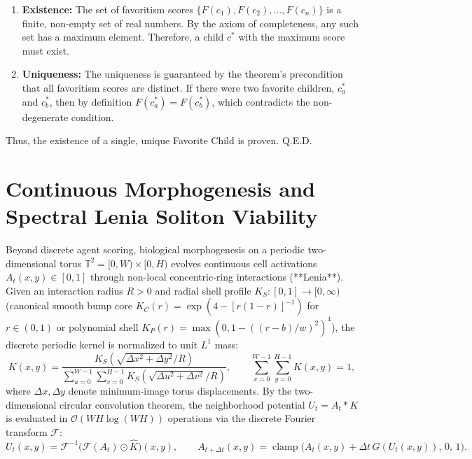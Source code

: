 \documentclass[12pt]{article}
\begin{document}
\begin{enumerate}
    \item \textbf{Existence:} The set of favoritism scores \( \{F(c_1), F(c_2), \dots, F(c_n)\} \) is a finite, non-empty set of real numbers. By the axiom of completeness, any such set has a maximum element. Therefore, a child \( c^* \) with the maximum score must exist.
    \item \textbf{Uniqueness:} The uniqueness is guaranteed by the theorem's precondition that all favoritism scores are distinct. If there were two favorite children, \( c_a^* \) and \( c_b^* \), then by definition \( F(c_a^*) = F(c_b^*) \), which contradicts the non-degenerate condition.
\end{enumerate}

Thus, the existence of a single, unique Favorite Child is proven. Q.E.D.

\section{Continuous Morphogenesis and Spectral Lenia Soliton Viability}

Beyond discrete agent scoring, biological morphogenesis on a periodic two-dimensional torus \( \mathbb{T}^2 = [0, W) \times [0, H) \) evolves continuous cell activations \( A_t(x, y) \in [0, 1] \) through non-local concentric-ring interactions (**Lenia**). Given an interaction radius \( R > 0 \) and radial shell profile \( K_S : [0, 1] \to [0, \infty) \) (canonical smooth bump core \( K_C(r) = \exp(4 - [r(1 - r)]^{-1}) \) for \( r \in (0, 1) \) or polynomial shell \( K_P(r) = \max(0, 1 - ((r - b)/w)^2)^4 \)), the discrete periodic kernel is normalized to unit \( L^1 \) mass:
\begin{equation}
K(x, y) = \frac{K_S\!\left(\sqrt{\Delta x^2 + \Delta y^2} / R\right)}{\sum_{u=0}^{W-1} \sum_{v=0}^{H-1} K_S\!\left(\sqrt{\Delta u^2 + \Delta v^2} / R\right)}, \qquad \sum_{x=0}^{W-1} \sum_{y=0}^{H-1} K(x, y) = 1,
\end{equation}
where \( \Delta x, \Delta y \) denote minimum-image torus displacements. By the two-dimensional circular convolution theorem, the neighborhood potential \( U_t = A_t * K \) is evaluated in \( \mathcal{O}(W H \log(W H)) \) operations via the discrete Fourier transform \( \mathcal{F} \):
\begin{equation}
U_t(x, y) = \mathcal{F}^{-1}\!\bigl(\mathcal{F}(A_t) \odot \hat{K}\bigr)(x, y), \qquad A_{t + \Delta t}(x, y) = \operatorname{clamp}\!\bigl(A_t(x, y) + \Delta t \, G(U_t(x, y)),\, 0,\, 1\bigr).
\end{equation}
\end{document}
